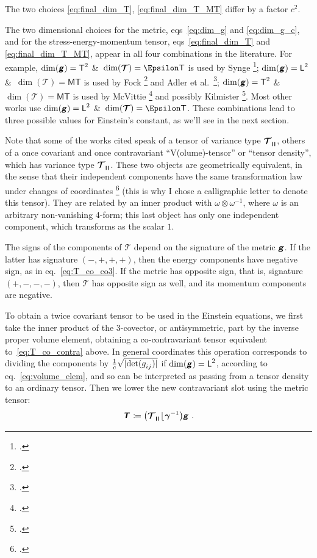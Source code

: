 \documentclass[\ifafour a4paper,12pt,\else a5paper,10pt,\fi%
onecolumn,oneside,article,%
british%
]{memoir}
\makeatletter
\theoremstyle{remark}
\theoremstyle{innote}
\newcommand*{\mathte}[1]{\textbf{\textit{\textsf{#1}}}}
\newcommand*{\citep}{\footcites}
\newcommand*{\amp}{\&}
\newcommand*{\defd}{\coloneqq}
\DeclarePairedDelimiter\abs{\lvert}{\rvert}
\renewcommand*{\|}[1][]{\nonscript\,#1\vert\nonscript\;\mathopen{}}
\newcommand*{\sect}{\S}%
\newcommand*{\sects}{\S\S}%
\newcommand*{\chaps}{chs}%
\newcommand*{\eqn}{eq.}%
\newcommand*{\eqns}{eqs}%
\newcommand*{\etal}{{et al.}}
\newcommand*{\q}{}%
\DeclareRobustCommand*{\q}{%
  \mathbin{\mathpalette\bigcdot@{}}%
}
\newcommand*{\bigcdot@scalefactor}{0.7}
\newcommand*{\bigcdot@widthfactor}{1.5}
\newcommand*{\bigcdot@}[2]{%
  \sbox0{$#1\vcenter{}$}%
  \sbox2{$#1\cdot\m@th$}%
  \hbox to \bigcdot@widthfactor\wd2{%
    \hfil
    \raise\ht0\hbox{%
      \scalebox{\bigcdot@scalefactor}{%
        \lower\ht0\hbox{$#1\bullet\m@th$}%
      }%
    }%
    \hfil
  }%
}
\newcommand*{\Le}{\textsf{L}}
\newcommand*{\Ti}{\textsf{T}}
\newcommand*{\Ma}{\textsf{M}}
\newcommand*{\En}{\Epsilon}%
\newcommand*{\rii}{\mathbin{\!\lfloor\!}}
\newcommand*{\yg}{\mathte{g}}
\newcommand*{\yT}{\bm{\mathcal{T}}}
\newcommand*{\yTe}{\mathte{T}}
\renewcommand*{\i}{\indices}
\newcommand*{\ygv}{\bm{\gamma}}
\newcommand*{\rul}{{\mkern2mu\rule[-0.1ex]{0.75pt}{1.1ex}\mkern2mu}}
\DeclarePairedDelimiter\mul{\rul}{\rul}%
\makeatother
\begin{document}
The two choices \eqref{eq:final_dim_T}, \eqref{eq:final_dim_T_MT} differ by
a factor $c^{2}$.

\medskip

The two dimensional choices for the metric, \eqns~\eqref{eq:dim_g} and
\eqref{eq:dim_g_c}, and for the stress-energy-momentum tensor,
\eqns~\eqref{eq:final_dim_T} and \eqref{eq:final_dim_T_MT}, appear in all
four combinations in the literature. For example, $\dim(\yg)=\Ti^{2}$ \amp\
$\dim(\yT)=\En\Ti$ is used by Synge \citep[\sects~IV.4--5]{synge1960b};
$\dim(\yg)=\Le^{2}$ \amp\ $\dim(\yT)=\Ma\Ti$ is used by Fock
\citep[\sects~V.54--55]{fock1955_t1964} and Adler \etal\
\citep[\sect~10.1]{adleretal1965_r1975}; $\dim(\yg)=\Ti^{2}$ \amp\
$\dim(\yT)=\Ma\Ti$ is used by McVittie
\citep[\sect~4.1]{mcvittie1956_r1965} and possibly Kilmister
\citep[\chaps~II--III; he seems to shift to natural units at some
point]{kilmister1973}. Most other works use $\dim(\yg)=\Le^{2}$ \amp\
$\dim(\yT)=\En\Ti$. These combinations lead to three possible values for
Einstein's constant, as we'll see in the next section.

\medskip

Note that some of the works cited speak of a tensor of variance type
$\yT\i{_{\q \mul{\q\q\q}}}$, others of a once covariant and once
contravariant \enquote{V(olume)-tensor} or \enquote{tensor density}, which
has variance type $\yT\i{_{\q}^{\q}_{\mul{\q\q\q\q}}}$. These two objects
are geometrically equivalent, in the sense that their independent
components have the same transformation law under changes of coordinates
\citep[\sect~II.8 p.~30]{schouten1951_r1989} (this is why I chose a
calligraphic letter to denote this tensor). They are related by an inner
product with $\omega\otimes\omega^{-1}$, where $\omega$ is an arbitrary
non-vanishing 4-form; this last object has only one independent component,
which transforms as the scalar $1$.

The signs of the components of $\yT$ depend on the signature of the metric
$\yg$. If the latter has signature $(-,+,+,+)$, then the energy components
have negative sign, as in \eqn~\eqref{eq:T_co_co3}. If the metric has
opposite sign, that is, signature $(+,-,-,-)$, then $\yT$ has opposite sign
as well, and its momentum components are negative.

\medskip

To obtain a twice covariant tensor to be used in the Einstein equations, we
first take the inner product of the 3-covector, or antisymmetric, part by
the inverse proper volume element, obtaining a co-contravariant tensor
equivalent to~\eqref{eq:T_co_contra} above. In general coordinates this
operation corresponds to dividing the components by
$\frac{1}{c}\sqrt{\smash[b]{\abs{\det(g\i{_{ij}})}}}$ if
$\dim(\yg)=\Le^{2}$, according to \eqn~\eqref{eq:volume_elem}, and so can
be interpreted as passing from a tensor density to an ordinary tensor. Then
we lower the new contravariant slot using the metric tensor:
\begin{gather}
  \label{eq:co_co_T}
  \yTe\i{_{\q\q}} \defd
  \bigl(\yT\i{_{\q\mul{\q\q\q}}} \rii \ygv^{-1} \bigr) \yg \ .
\end{gather}
\end{document}
